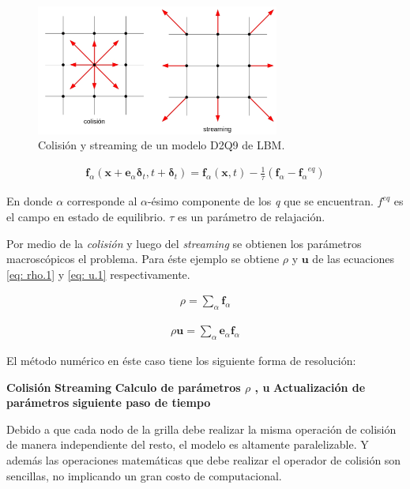 \begin{figure}[h!]
	\centering
	\includegraphics[width=8cm]{grilla_stre_colli_intro.png}
	\caption{Colisión y streaming de un modelo D2Q9 de LBM.}
	\label{fig:grilla_D2Q9}
\end{figure}


\begin{align}
	\mathbf{f}_{\alpha} (\mathbf{x} + \mathbf{e}_{\alpha} \mathbf{\delta}_{t}, t + \mathbf{\delta}_{t})  = \mathbf{f}_{\alpha} (\mathbf{x}, t) - \frac{1}{\tau} (\mathbf{f}_{\alpha} - {\mathbf{f}_{\alpha}}^{eq}) 
\end{align}

En donde $\alpha$ corresponde al  $\alpha$-ésimo componente de los \textit{q} que se encuentran. $f^{eq}$ es el campo en estado de equilibrio. $\tau$ es un parámetro de relajación. 

Por medio de la \textit{colisión} y luego del \textit{streaming} se obtienen los parámetros macroscópicos el problema. Para éste ejemplo se obtiene $\rho$ y $\mathbf{u}$ de las ecuaciones \ref{eq: rho.1} y \ref{eq: u.1} respectivamente.

\begin{align}
	\rho = \sum_{\alpha} \mathbf{f}_{\alpha}
	\label{eq: rho.1}
\end{align}

\begin{align}
	\rho \mathbf{u}= \sum_{\alpha} \mathbf{e}_{\alpha} \mathbf{f}_{\alpha}
	\label{eq: u.1}
\end{align}

El método numérico en éste caso tiene los siguiente forma de resolución:

	 \textbf{Colisión}  \textbf{Streaming} \textbf{Calculo de parámetros $\rho$ , u} \textbf{Actualización de parámetros} \textbf{siguiente paso de tiempo} 

Debido a que cada nodo de la grilla debe realizar la misma operación de colisión de manera independiente del resto, el modelo es altamente paralelizable. Y además las operaciones matemáticas que debe realizar el operador de colisión son sencillas, no implicando un gran costo de computacional.




